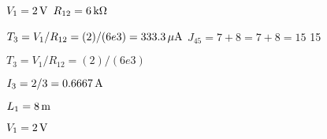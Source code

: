 \skipLine

\skipLine






\mbox{$V_{1}=\mbox{$2 \,\mathrm{ V}$}$} \mbox{$R_{12}=\mbox{$6 \,\mathrm{k \Omega}$}$}

\mbox{$T_3 = V_{1}/R_{12}  =  (2)/(6e3) = \mbox{$333.3 \,\mathrm{\mu A}$}$} \mbox{$J_{45}=7+8  = 7+8 = 15$} 15

\mbox{$T_3 = V_{1}/R_{12}  =  (2)/(6e3)$}

\mbox{$I_{3}=2/3  = \mbox{$0.6667 \,\mathrm{ A}$}$}

\mbox{$L_{1}=\mbox{$8 \,\mathrm{ m}$}$}

\skipLine

\skipLine

\mbox{$V_{1}=\mbox{$2 \,\mathrm{ V}$}$}
